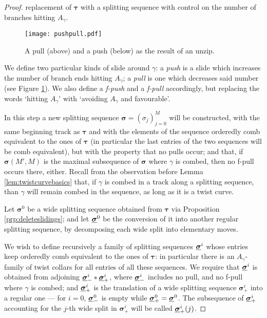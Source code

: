 \begin{proof}
 replacement of $\bm\tau$ with a splitting sequence with control on the number of branches hitting $A_\gamma$.

\begin{figure}[h]
\centering
\texttt{[image: pushpull.pdf]}
\caption{\label{fig:pushpull}A pull (above) and a push (below) as the result of an unzip.}
\end{figure}

We define two particular kinds of slide around $\gamma$: a \emph{push} is a slide which increases the number of branch ends hitting $A_\gamma$; a \emph{pull} is one which decreases said number (see Figure \ref{fig:pushpull}). We also define a \emph{f-push} and a \emph{f-pull} accordingly, but replacing the words `hitting $A_\gamma$' with `avoiding $A_\gamma$ and favourable'.

In this step a new splitting sequence $\bm\sigma=(\sigma_j)_{j=0}^M$ will be constructed, with the same beginning track as $\bm\tau$ and with the elements of the sequence orderedly comb equivalent to the ones of $\bm\tau$ (in particular the last entries of the two sequences will be comb equivalent), but with the property that no pulls occur; and that, if $\bm\sigma(M',M)$ is the maximal subsequence of $\bm\sigma$ where $\gamma$ is combed, then no f-pull occurs there, either. Recall from the observation before Lemma \ref{lem:twistcurvebasics} that, if $\gamma$ is combed in a track along a splitting sequence, than $\gamma$ will remain combed in the sequence, as long as it is a twist curve.

Let $\bm\sigma^0$ be a wide splitting sequence obtained from $\bm\tau$ via Proposition \ref{prp:deleteslidings}; and let $\underline{\bm\sigma}^0$ be the conversion of it into another regular splitting sequence, by decomposing each wide split into elementary moves. 

We wish to define recursively a family of splitting sequences $\underline{\bm\sigma}^i$ whose entries keep orderedly comb equivalent to the ones of $\bm\tau$: in particular there is an $A_\gamma$-family of twist collars for all entries of all these sequences. We require that $\underline{\bm\sigma}^i$ is obtained from adjoining $\underline{\bm\sigma}^i_-*\underline{\bm\sigma}^i_+$, where $\underline{\bm\sigma}^i_-$ includes no pull, and no f-pull where $\gamma$ is combed; and $\underline{\bm\sigma}^i_+$ is the translation of a wide splitting sequence $\bm\sigma^i_+$ into a regular one --- for $i=0$, $\underline{\bm\sigma}^0_-$ is empty while $\underline{\bm\sigma}^0_+=\underline{\bm\sigma}^0$. The subsequence of $\underline{\bm\sigma}^i_+$ accounting for the $j$-th wide split in $\bm\sigma^i_+$ will be called $\underline{\bm\sigma}^i_+(j)$.


\end{proof}
